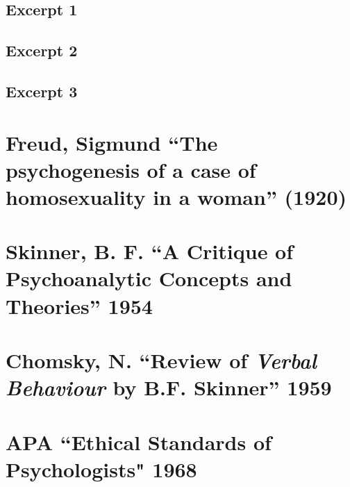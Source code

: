 \begin{refsection}
\begin{appendices}
\subsection{Excerpt 1}
\label{excerpt1}

\label{app: KraftEbbing1}


\subsection{Excerpt 2}
\label{excerpt2}

\label{app: KraftEbbing2}


\subsection{Excerpt 3}
\label{excerpt3}

\label{app: KraftEbbing3}


\section{Freud, Sigmund “The psychogenesis of a case of homosexuality in a woman” (1920)}
\label{freudsigmund“thepsychogenesisofacaseofhomosexualityinawoman”1920}

\label{app: Freud}


\section{Skinner, B. F. “A Critique of Psychoanalytic Concepts and Theories” 1954}
\label{skinnerb.f.“acritiqueofpsychoanalyticconceptsandtheories”1954}

\label{app: Skinner}


\section{Chomsky, N. “Review of \emph{Verbal Behaviour} by B.F. Skinner” 1959}
\label{chomskyn.“reviewofverbalbehaviourbyb.f.skinner”1959}

\label{app: Chomsky}


\section{APA “Ethical Standards of Psychologists" 1968}
\label{apa“ethicalstandardsofpsychologists1968}


\end{appendices}
\end{refsection}
